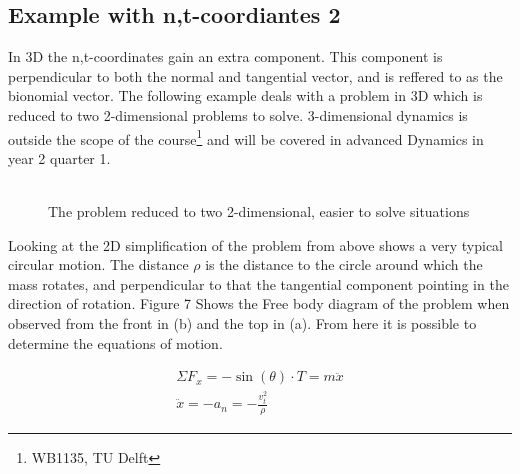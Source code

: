 \documentclass[11pt, a4paper]{article}
\begin{document}
\subsection{Example with n,t-coordiantes 2}
In 3D the n,t-coordinates gain an extra component. This component is perpendicular to both the 
normal and tangential vector, and is reffered to as the bionomial vector. The following example
deals with a problem in 3D which is reduced to two 2-dimensional problems to solve. 3-dimensional
dynamics is outside the scope of the course\footnote{WB1135, TU Delft} and will be covered in advanced Dynamics in year 2 quarter 1.\\
\\
\begin{figure}[h]
    \centering
    \qquad
    \caption{The problem reduced to two 2-dimensional, easier to solve situations}
\end{figure}

Looking at the 2D simplification of the problem from above shows a very typical circular motion.
The distance $\rho$ is the distance to the circle around which the mass rotates, and perpendicular 
to that the tangential component pointing in the direction of rotation. Figure 7 Shows the Free body diagram of the problem when
observed from the front in (b) and the top in (a). From here it is possible to determine the equations of motion.

\begin{gather}
    \Sigma F_x = -\sin(\theta)\cdot T = m\ddot{x}\\
    \ddot{x} = -a_n = -\frac{v_t^2}{\rho}
\end{gather}
\end{document}
